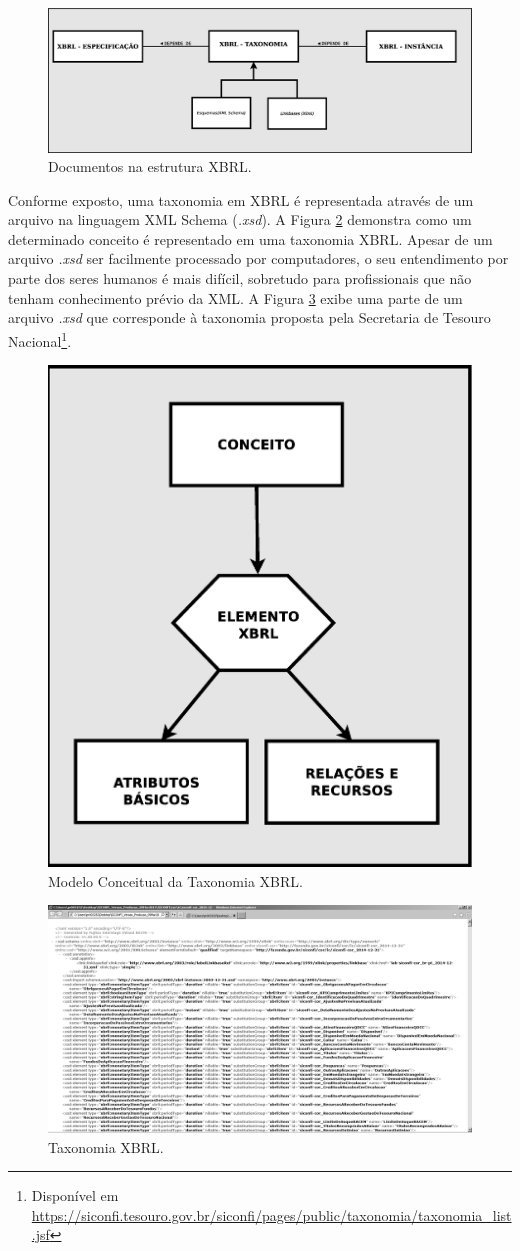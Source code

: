 \documentclass[msc,proposal,hidelot,hideabstract]{ppgccufmg} %
\begin{document}
\begin{figure}[hbtp]
\centering
\includegraphics[width=1.0\textwidth]{img/documentos_in_xbrl.eps}
\caption{Documentos na estrutura XBRL.}
\label{fig:docs_xbrl}
\end{figure}

Conforme exposto, uma taxonomia em XBRL é representada através de um arquivo na linguagem XML Schema (\textit{.xsd}). A Figura \ref{fig:taxonomia_xbrl} demonstra como um determinado conceito é representado em uma taxonomia XBRL. Apesar de um arquivo \textit{.xsd} ser facilmente processado por computadores, o seu entendimento por parte dos seres humanos é mais difícil, sobretudo para profissionais que não tenham conhecimento prévio da XML. A Figura \ref{fig:arquivo_xsd} exibe uma parte de um arquivo \textit{.xsd} que corresponde à taxonomia proposta pela Secretaria de Tesouro Nacional\footnote{Disponível em \url{https://siconfi.tesouro.gov.br/siconfi/pages/public/taxonomia/taxonomia_list.jsf}}.

\begin{figure}[hbtp]
\centering
\includegraphics[width=.5\textwidth]{img/taxonomia.eps}
\caption{Modelo Conceitual da Taxonomia XBRL.}
\label{fig:taxonomia_xbrl}
\end{figure}

\begin{figure}[hbtp]
\centering
\includegraphics[width=.75\textwidth]{img/arquivo_xsd.png}
\caption{Taxonomia XBRL.}
\label{fig:arquivo_xsd}
\end{figure}
\end{document}
